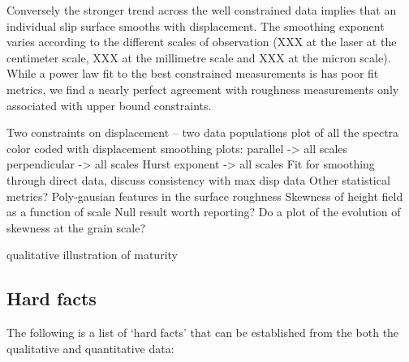 \documentclass[12pt,a4paper]{article}
\begin{document}
Conversely the stronger trend across the well constrained data implies that an individual slip surface smooths with displacement. The smoothing exponent varies according to the different scales of observation (XXX at the laser at the centimeter scale, XXX at the millimetre scale and XXX at the micron scale).  While a power law fit to the best constrained measurements is has poor fit metrics, we find a nearly perfect agreement with roughness measurements only associated with upper bound constraints.


Two constraints on displacement – two data populations
plot of all the spectra color coded with displacement
smoothing plots:
	parallel -> all scales
	perpendicular -> all scales
	Hurst exponent -> all scales
Fit for smoothing through direct data, discuss consistency with max disp data
Other statistical metrics?
	Poly-gausian features in the surface roughness
	Skewness of height field as a function of scale
		Null result worth reporting?
		Do a plot of the evolution of skewness at the grain scale?




qualitative illustration of maturity


\subsection{Hard facts}

The following is a list of  `hard facts' that can be established from the both the qualitative and quantitative data:
\end{document}
